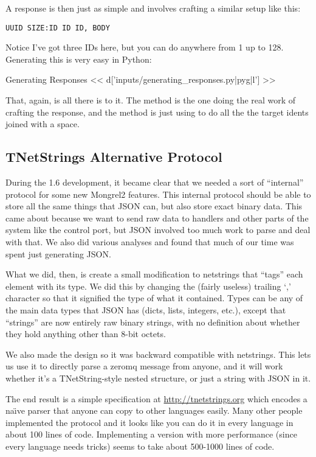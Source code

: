 A response is then just as simple and involves crafting a similar
setup like this:

\begin{Verbatim}
UUID SIZE:ID ID ID, BODY
\end{Verbatim}

Notice I've got three IDs here, but you can do anywhere from 1 up to 128.  Generating
this is very easy in Python:

\begin{code}{Generating Responses}
<< d['inputs/generating_responses.py|pyg|l'] >>
\end{code}

That, again, is all there is to it.  The  method is the
one doing the real work of crafting the response, and the 
method is just using  to do all the the target idents
joined with a space.

\subsection{TNetStrings Alternative Protocol}
During the 1.6 development, it became clear that we needed a sort of ``internal''
protocol for some new Mongrel2 features.  This internal protocol should be
able to store all the same things that JSON can, but also store exact binary
data.  This came about because we want to send raw data to handlers and
other parts of the system like the control port, but JSON involved too
much work to parse and deal with that.  We also did various analyses and
found that much of our time was spent just generating JSON.

What we did, then, is create a small modification to netstrings that ``tags''
each element with its type.  We did this by changing the (fairly useless)
trailing `,' character so that it signified the type of what it contained.
Types can be any of the main data types that JSON has (dicts, lists, integers, etc.),
except that ``strings'' are now entirely raw binary strings, with no
definition about whether they hold anything other than 8-bit octets.

We also made the design so it was backward compatible with netstrings.
This lets us use it to directly parse a zeromq message from anyone, and
it will work whether it's a TNetString-style nested structure, or just
a string with JSON in it.

The end result is a simple specification at \href{http://tnetstrings.org}{http://tnetstrings.org}
which encodes a na\"{\i}ve parser that anyone can copy to other languages easily.
Many other people implemented the protocol and it looks like you can do
it in every language in about 100 lines of code.  Implementing a version
with more performance (since every language needs tricks) seems to take
about 500-1000 lines of code.

